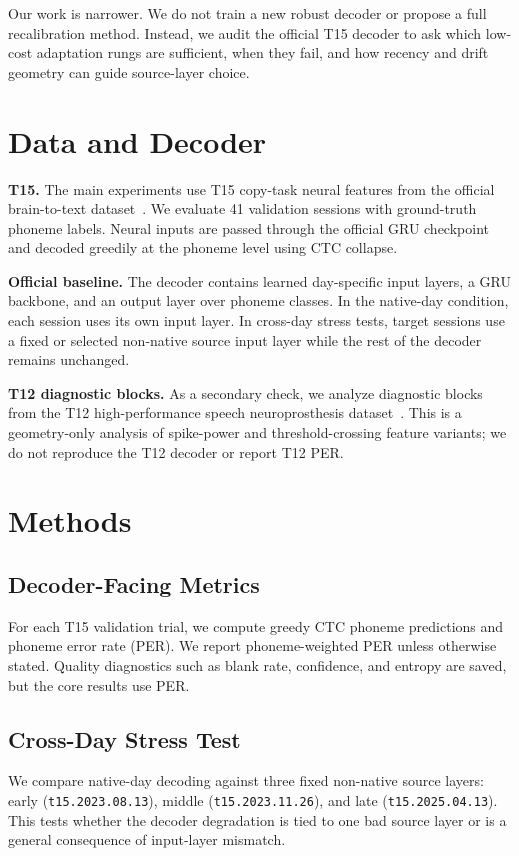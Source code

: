 \documentclass{article}
\begin{document}
Our work is narrower. We do not train a new robust decoder or propose a full recalibration method. Instead, we audit the official T15 decoder to ask which low-cost adaptation rungs are sufficient, when they fail, and how recency and drift geometry can guide source-layer choice.

\section{Data and Decoder}
\textbf{T15.} The main experiments use T15 copy-task neural features from the official brain-to-text dataset~\cite{card2024accurate}. We evaluate 41 validation sessions with ground-truth phoneme labels. Neural inputs are passed through the official GRU checkpoint and decoded greedily at the phoneme level using CTC collapse.

\textbf{Official baseline.} The decoder contains learned day-specific input layers, a GRU backbone, and an output layer over phoneme classes. In the native-day condition, each session uses its own input layer. In cross-day stress tests, target sessions use a fixed or selected non-native source input layer while the rest of the decoder remains unchanged.

\textbf{T12 diagnostic blocks.} As a secondary check, we analyze diagnostic blocks from the T12 high-performance speech neuroprosthesis dataset~\cite{willett2023speech}. This is a geometry-only analysis of spike-power and threshold-crossing feature variants; we do not reproduce the T12 decoder or report T12 PER.

\section{Methods}
\subsection{Decoder-Facing Metrics}
For each T15 validation trial, we compute greedy CTC phoneme predictions and phoneme error rate (PER). We report phoneme-weighted PER unless otherwise stated. Quality diagnostics such as blank rate, confidence, and entropy are saved, but the core results use PER.

\subsection{Cross-Day Stress Test}
We compare native-day decoding against three fixed non-native source layers: early (\texttt{t15.2023.08.13}), middle (\texttt{t15.2023.11.26}), and late (\texttt{t15.2025.04.13}). This tests whether the decoder degradation is tied to one bad source layer or is a general consequence of input-layer mismatch.
\end{document}
